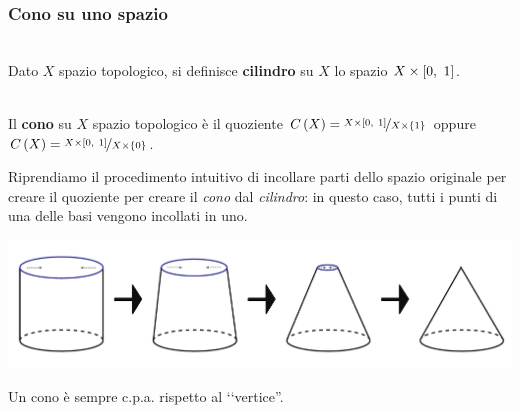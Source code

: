 \subsubsection{Cono su uno spazio}
\begin{define}[Cilindro.]~{}\\
	Dato $X$ spazio topologico, si definisce \textbf{cilindro} su $X$ lo spazio $X\times \left[0,\ 1\right]$.
\end{define}
\begin{define}[Cono.]~{}\\
	Il \textbf{cono} su $X$ spazio topologico è il quoziente $\displaystyle C\left(X\right)=\nicefrac{X\times\left[0,\ 1\right]}{X\times\{1\}}$ oppure $\displaystyle C\left(X\right)=\nicefrac{X\times\left[0,\ 1\right]}{X\times\{0\}}$.
\end{define}
\begin{intuit}
	Riprendiamo il procedimento intuitivo di incollare parti dello spazio originale per creare il quoziente per creare il \textit{cono} dal \textit{cilindro}: in questo caso, tutti i punti di una delle basi vengono incollati in uno.
\begin{center}
	\includegraphics[trim=0cm 0cm 0cm 0cm,clip,scale=0.4]{images/cilindertocone.pdf}
\end{center}
\vspace{-6mm}
\end{intuit}
\begin{observe}
	Un cono è sempre c.p.a. rispetto al ‘‘vertice''.
\end{observe}
